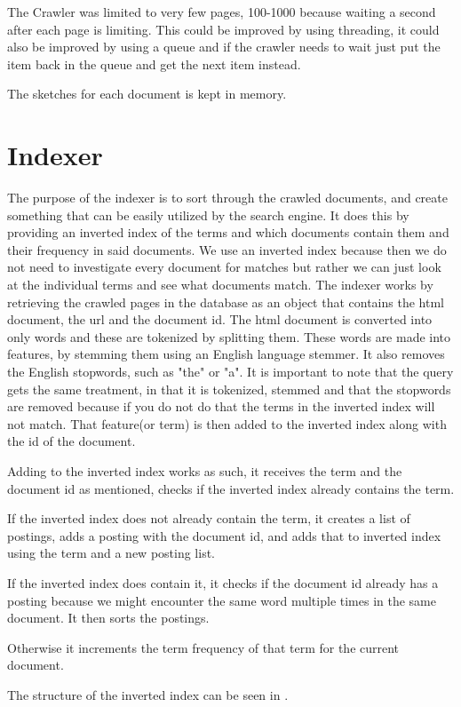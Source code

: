 	The Crawler was limited to very few pages, 100-1000 because waiting a second after each page is limiting. This could be improved by using threading, it could also be improved by using a queue and if the crawler needs to wait just put the item back in the queue and get the next item instead.
	
	The sketches for each document is kept in memory.
	
	\section{Indexer}
	The purpose of the indexer is to sort through the crawled documents, and create something that can be easily utilized by the search engine. It does this by providing an inverted index of the terms and which documents contain them and their frequency in said documents.
	We use an inverted index because then we do not need to investigate every document for matches but rather we can just look at the individual terms and see what documents match.
	The indexer works by retrieving the crawled pages in the database as an object that contains the html document, the url and the document id.
	The html document is converted into only words and these are tokenized by splitting them. 
	These words are made into features, by stemming them using an English language stemmer. It also removes the English stopwords, such as "the" or "a".
	It is important to note that the query gets the same treatment, in that it is tokenized, stemmed and that the stopwords are removed because if you do not do that the terms in the inverted index will not match.
	That feature(or term) is then added to the inverted index along with the id of the document.
	
	Adding to the inverted index works as such, it receives the term and the document id as mentioned, checks if the inverted index already contains the term.
	
	If the inverted index does not already contain the term, it creates a list of postings, adds a posting with the document id, and adds that to inverted index using the term and a new posting list.
	
	If the inverted index does contain it, it checks if the document id already has a posting because we might encounter the same word multiple times in the same document. It then sorts the postings.
	
	Otherwise it increments the term frequency of that term for the current document.
	
	The structure of the inverted index can be seen in .
	
